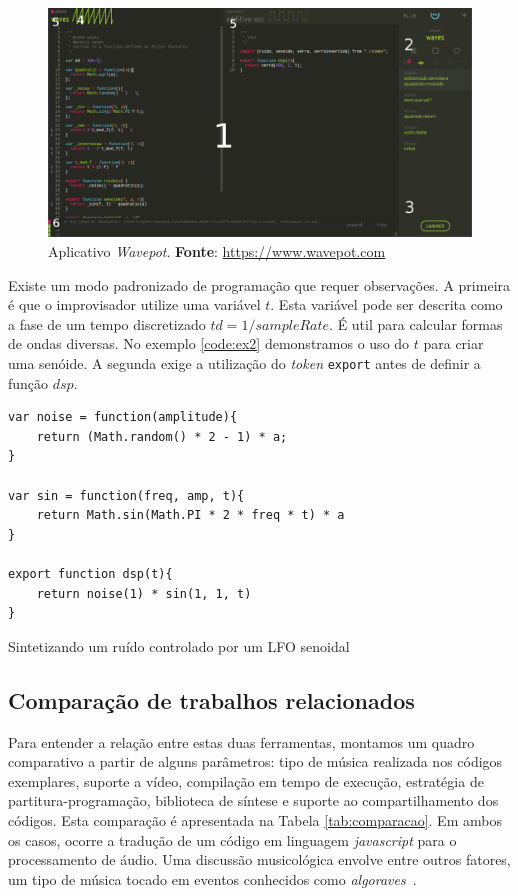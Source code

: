 \begin{figure}[h]
\centering
\includegraphics[scale=0.35]{wavepot.png}
\caption{Aplicativo \emph{Wavepot}. \textbf{Fonte}: \protect\url{https://www.wavepot.com}}
\label{fig:wavepot}
\end{figure}

Existe um modo padronizado de programação que requer observações. A primeira é que o improvisador utilize uma variável $t$. Esta variável pode ser descrita como a fase de um tempo discretizado $td=1/sampleRate$. É util para calcular formas de ondas diversas. No exemplo \ref{code:ex2} demonstramos o uso do $t$ para criar uma senóide. A segunda exige a utilização do \emph{token} \verb|export| antes de definir a função $dsp$.


\begin{listing}
\begin{verbatim}
var noise = function(amplitude){
    return (Math.random() * 2 - 1) * a;
}

var sin = function(freq, amp, t){
    return Math.sin(Math.PI * 2 * freq * t) * a
}

export function dsp(t){
    return noise(1) * sin(1, 1, t)
}
\end{verbatim}
\caption{Sintetizando um ruído controlado por um LFO senoidal}
\label{code:ex2}
\end{listing}



\subsection{Comparação de trabalhos relacionados}

Para entender a relação entre estas duas ferramentas, montamos um quadro comparativo a partir de alguns parâmetros: tipo de música realizada nos códigos exemplares,  suporte a vídeo, compilação em tempo de execução, estratégia de partitura-programação,  biblioteca de síntese e suporte ao compartilhamento dos códigos. Esta comparação é apresentada na Tabela \ref{tab:comparacao}.
Em ambos os casos, ocorre a tradução de um código em linguagem \emph{javascript} para o processamento de áudio.
Uma discussão musicológica envolve entre outros fatores, um tipo de música tocado em eventos conhecidos como \emph{algoraves}~\cite{collins_algorave:_2014,mori_analysing_2015}.


